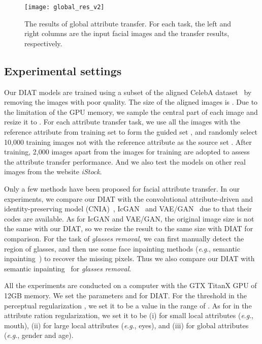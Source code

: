 \documentclass[journal]{IEEEtran}
\newcommand{\eg}{\textit{e}.\textit{g}.}
\begin{document}
\begin{figure*}
\begin{center}
\texttt{[image: global\_res\_v2]}
\end{center}
   \caption{The results of global attribute transfer. For each task, the left and right columns are the input facial images and the transfer results, respectively.}
\label{global_results}
\end{figure*}


\subsection{Experimental settings}
Our DIAT models are trained using a subset of the aligned CelebA dataset~\cite{liu2015faceattributes} by removing the images with poor quality.
The size of the aligned images is . Due to the limitation of the GPU memory, we sample the central part of each image and resize it to .
For each attribute transfer task, we use all the images with the reference attribute from training set to form the guided set , and randomly select 10,000 training images not with the reference attribute as the source set .
After training, 2,000 images apart from the images for training are adopted to assess the attribute transfer performance.
And we also test the models on other real images from the website \emph{iStock}.



Only a few methods have been proposed for facial attribute transfer.
In our experiments, we compare our DIAT with the convolutional attribute-driven and identity-preserving model (CNIA)~\cite{li2016convolutional}, IcGAN~\cite{Perarnau2016} and VAE/GAN~\cite{larsen2015autoencoding} due to that their codes are available.
As for IcGAN and VAE/GAN, the original image size is not the same with our DIAT, so we resize the result to the same size with DIAT for comparison.
For the task of \emph{glasses removal}, we can first manually detect the region of glasses, and then use some face inpainting methods (\eg, semantic inpainting~\cite{yeh2016semantic}) to recover the missing pixels.
Thus we also compare our DIAT with semantic inpainting~\cite{yeh2016semantic} for \emph{glasses removal}.


All the experiments are conducted on a computer with the GTX TitanX GPU of 12GB memory.
We set the parameters  and  for DIAT.
For the threshold  in the perceptual regularization , we set it to be a value in the range of .
As for  in the attribute ration regularization, we set it to be (i)  for small local attributes (\eg, mouth), (ii)  for large local attributes (\eg, eyes), and (iii)  for global attributes (\eg, gender and age).
\end{document}
